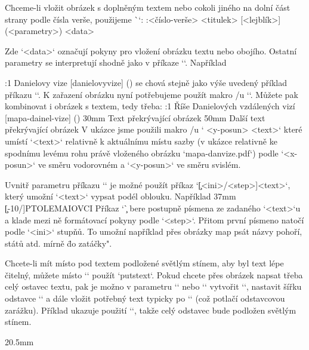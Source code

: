 Chceme-li vložit obrázek s doplněným textem nebo cokoli jiného na dolní část
strany podle čísla verše, použijeme \`\putBot`:
\begtt
{}:<číslo-verše> {<titulek>} [<lejblík>] (<parametry>) {<data>}
\endtt

Zde `<data>` označují pokyny pro vložení obrázku textu nebo obojího. Ostatní
parametry se interpretují shodně jako v příkaze `\putImage`. Například

\begtt
{}:1 {Danielovy vize} [danielovyvize] () {}
\endtt
%
se chová stejně jako výše uvedený příklad příkazu `\putImage`. K zařazení
obrázku nyní potřebujeme použít makro \OpTeX/u `\inspic`. Můžete pak
kombinovat i obrázek s textem, tedy třeba:
\begtt
{}:1 {Říše Danielových vzdálených vizí} [mapa-dainel-vize] () {
   \Heros \cond {}\rm %
   \puttext 20mm 30mm {Text překrývající obrázek}
   \puttext 30mm 50mm {Další text překrývající obrázek} 
}
\endtt
%
V ukázce jsme použili makro \OpTeX/u ` <y-posun> {<text>}`
které umístí `<text>` relativně k aktuálnímu místu sazby (v ukázce relativně
ke spodnímu levému rohu právě vloženého obrázku `mapa-danvize.pdf`) podle  
`<x-posun>` ve směru vodorovném a  `<y-posun>` ve směru svislém.

Uvnitř parametru příkazu `\puttext` je možné použít příkaz 
`\c[<ini>/<step>]{<text>}`, který umožní `<text>` vypsat podél oblouku.
Například
\begtt
\puttext 2mm 37mm {\c[-10/\kern4pt]{PTOLEMAIOVCI}}
\endtt
%
Příkaz `\c` bere postupně písmena ze zadaného `<text>`u a klade mezi ně
formátovací pokyny podle `<step>`. Přitom první písmeno natočí podle `<ini>`
stupňů. To umožní například přes obrázky map psát názvy pohoří, států atd. mírně
\"do zatáčky".

Chcete-li mít místo pod textem podložené světlým stínem, aby byl text lépe
čitelný, můžete místo `\puttext` použít `putstext`. Pokud chcete přes
obrázek napsat třeba celý ostavec textu, pak je možno v parametru `\puttext`
nebo `\putstext` vytvořit `\vtop`, nastavit šířku odstavce `\hsize` a dále
vložit potřebný text typicky po `\noindent` (což potlačí odstavcovou
zarážku). Příklad ukazuje použití `\putstext`, takže celý odstavec bude podložen
světlým stínem.

\begtt
\putstext 54.15mm 20.5mm {}
\endtt

